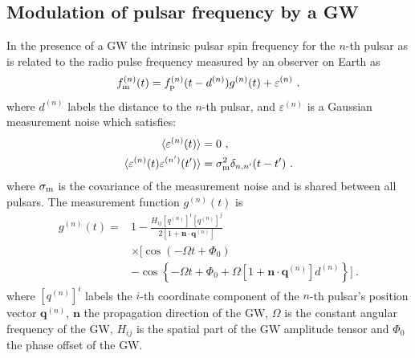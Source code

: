 \documentclass[fleqn,usenatbib,useAMS]{mnras}
\begin{document}
\subsection{Modulation of pulsar frequency by a GW} \label{sec:psr_measured}
In the presence of a GW the intrinsic pulsar spin frequency for the  $n$-th pulsar as is related to the radio pulse frequency measured by an observer on Earth as
\begin{equation}
	f_{\rm m}^{(n)}(t) = f_{\rm p}^{(n)}(t-d^{(n)}) g^{(n)}(t) +  \varepsilon^{(n)}\ .
	\label{eq:measurement}
\end{equation}
where $d^{(n)}$ labels the distance to the $n$-th pulsar, and $\varepsilon^{(n)}$ is a Gaussian measurement noise which satisfies: 
\begin{align}
	\langle \varepsilon^{(n)}(t) \rangle &= 0 \ , \\
	\langle \varepsilon^{(n)}(t) \varepsilon^{(n')}(t') \rangle &= \sigma_{\rm m}^2 \delta_{n,n'}(t - t') \ .	\label{eq:vareps}
\end{align}
where $\sigma_{\rm m}$ is the covariance of the measurement noise and is shared between all pulsars. The measurement function $g^{(n)}(t)$ is
\begin{align}
	g^{(n)}(t) =& 1 - \frac{ H_{ij}[q^{(n)}]^i [q^{(n)}]^j }{2 [1 + \boldsymbol{n}\cdot \boldsymbol{q}^{(n)}] } \nonumber \\
	& \times \Big[\cos\left(-\Omega t +\Phi_0\right) \nonumber \\
	&- \cos \left \{-\Omega t +\Phi_0 + \Omega \left[1 + \boldsymbol{n}\cdot \boldsymbol{q}^{(n)} \right]  d^{(n)} \right \} \Big ] \ .
	\label{eq:g_func_trig}
\end{align}
where $[q^{(n)}]^i$ labels the $i$-th coordinate component of the $n$-th pulsar's position vector $\boldsymbol{q}^{(n)}$, $\boldsymbol{n}$ the propagation direction of the GW, $\Omega$ is the constant angular frequency of the GW, $H_{ij}$ is the spatial part of the GW amplitude tensor and $\Phi_0$ the phase offset of the GW. \newline 
\end{document}
